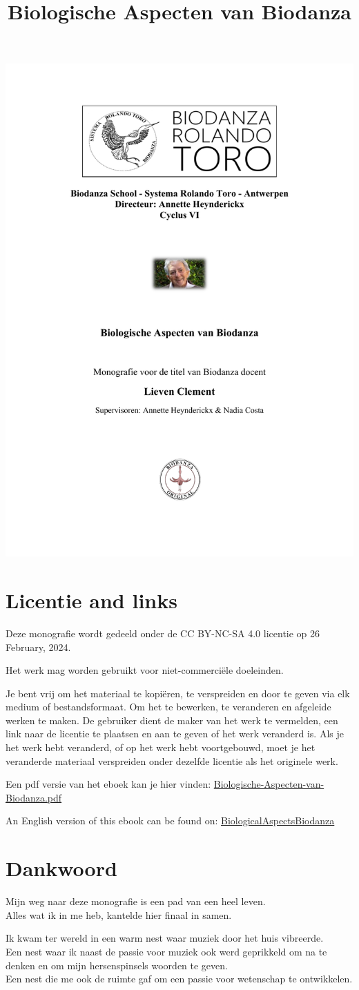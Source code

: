 \documentclass[
  11pt,
]{book}
\title{Biologische Aspecten van Biodanza}
\author{}
\date{\vspace{-2.5em}}
\renewcommand{\maketitle}{
\begin{center}\includegraphics[width=1\linewidth]{./figs/titlePage} \end{center}
\newpage
\frontmatter
\pagenumbering{roman}
}
\begin{document}
\maketitle

{
\hypersetup{linkcolor=}
\setcounter{tocdepth}{2}
\tableofcontents
}
\hypertarget{licentie-and-links}{%
\chapter*{Licentie and links}\label{licentie-and-links}}

Deze monografie wordt gedeeld onder de CC BY-NC-SA 4.0 licentie op 26 February, 2024.

Het werk mag worden gebruikt voor niet-commerciële doeleinden.

Je bent vrij om het materiaal te kopiëren, te verspreiden en door te geven via elk medium of bestandsformaat. Om het te bewerken, te veranderen en afgeleide werken te maken. De gebruiker dient de maker van het werk te vermelden, een link naar de licentie te plaatsen en aan te geven of het werk veranderd is. Als je het werk hebt veranderd, of op het werk hebt voortgebouwd, moet je het veranderde materiaal verspreiden onder dezelfde licentie als het originele werk.

Een pdf versie van het eboek kan je hier vinden: \href{https://biodanzabrugge.be/biologischeAspectenBiodanza/Biologische-Aspecten-van-Biodanza.pdf}{Biologische-Aspecten-van-Biodanza.pdf}

An English version of this ebook can be found on: \href{https://biodanzabrugge.be/biologicalAspectsBiodanza/}{BiologicalAspectsBiodanza}

\mainmatter

\hypertarget{dankwoord}{%
\chapter*{Dankwoord}\label{dankwoord}}

Mijn weg naar deze monografie is een pad van een heel leven.\\
Alles wat ik in me heb, kantelde hier finaal in samen.

Ik kwam ter wereld in een warm nest waar muziek door het huis vibreerde.\\
Een nest waar ik naast de passie voor muziek ook werd geprikkeld om na te denken en om mijn hersenspinsels woorden te geven.\\
Een nest die me ook de ruimte gaf om een passie voor wetenschap te ontwikkelen.
\end{document}

